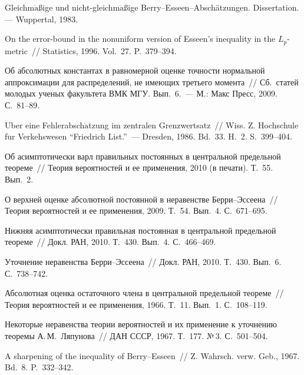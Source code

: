 \begin{multicols}{2}
{{\begin{thebibliography}{99}
 Gleichm$\ddot{\mbox{a}}${\!\!\ptb\ss}ige und
nicht-gleichm$\ddot{\mbox{a}}${\!\!\ptb\ss}ige Berry--\linebreak Esseen--Absch{\"a}tzungen.
Dissertation. --- Wuppertal, 1983.

 On the error-bound in the nonuniform version of
Esseen's inequality in the $L_p$-metric~// Statistics, 1996.
Vol.~27. P.~379--394.

 Об абсолютных
константах в равномерной оценке точности нормальной аппроксимации
для распределений, не имеющих третьего момента~// Сб.\ статей
молодых ученых факультета ВМК МГУ. Вып.~6.~--- М.: Макс Пресс, 2009.
С.~81--89.

 $\ddot{\mbox{U}}$ber eine Fehlerabsch$\ddot{\mbox{a}}$tzung im zentralen
Grenzwertsatz~// Wiss. Z. Hochschule f$\ddot{\mbox{u}}$r Verkehswesen
``Friedrich List.''~--- Dresden, 1986. Bd.~33. H.~2. S.~399--404.

 Об асимптотически варл правильных постоянных в
центральной предельной теореме~// Тео\-рия вероятностей и ее
применения, 2010 (в пе\-ча\-ти). Т.~55. Вып.~2.

 О верхней оценке абсолютной
постоянной в неравенстве Берри--Эссеена~// Теория вероятностей и ее
применения, 2009. Т.~54. Вып.~4. С.~671--695.

 Нижняя асимптотически правильная постоянная в
центральной предельной теореме~// Докл. РАН, 2010.
Т.~430. Вып.~4. С.~466--469.

 Уточнение неравенства
Берри--Эссеена~// Докл. РАН, 2010. Т.~430. Вып.~6.
С.~738--742.

 Абсолютная оценка остаточного члена в
центральной предельной теореме~// Теория вероятностей и ее
применения, 1966. Т.~11. Вып.~1. С.~108--119.

 Некоторые неравенства теории вероятностей и их
применение к уточнению теоремы А.\,М.~Ляпунова~// ДАН СССР, 1967.
Т.~177. №\,3. С.~501--504.

 A sharpening of the inequality of
Berry--Esseen~// Z. Wahrsch. verw. Geb., 1967. Bd.~8. P.~332--342.


\end{thebibliography}}}
\end{multicols}
